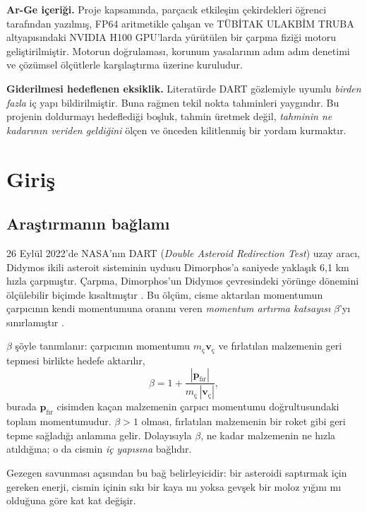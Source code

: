 \documentclass[12pt,a4paper]{article}
\begin{document}
\noindent\textbf{Ar-Ge içeriği.} Proje kapsamında, parçacık etkileşim
çekirdekleri öğrenci tarafından yazılmış, FP64 aritmetikle çalışan ve
TÜBİTAK ULAKBİM TRUBA altyapısındaki NVIDIA H100 GPU'larda yürütülen bir
çarpma fiziği motoru geliştirilmiştir. Motorun doğrulaması, korunum
yasalarının adım adım denetimi ve çözümsel ölçütlerle karşılaştırma
üzerine kuruludur.

\noindent\textbf{Giderilmesi hedeflenen eksiklik.} Literatürde DART
gözlemiyle uyumlu \emph{birden fazla} iç yapı bildirilmiştir. Buna
rağmen tekil nokta tahminleri yaygındır. Bu projenin doldurmayı
hedeflediği boşluk, tahmin üretmek değil, \emph{tahminin ne kadarının
veriden geldiğini} ölçen ve önceden kilitlenmiş bir yordam kurmaktır.

\section{Giriş}

\subsection{Araştırmanın bağlamı}

26 Eylül 2022'de NASA'nın DART (\emph{Double Asteroid Redirection Test})
uzay aracı, Didymos ikili asteroit sisteminin uydusu Dimorphos'a saniyede
yaklaşık 6,1 km hızla çarpmıştır. Çarpma, Dimorphos'un Didymos
çevresindeki yörünge dönemini ölçülebilir biçimde kısaltmıştır
\citep{daly2023}. Bu ölçüm, cisme aktarılan momentumun çarpıcının kendi
momentumuna oranını veren \emph{momentum artırma katsayısı} $\beta$'yı
sınırlamıştır \citep{cheng2023}.

$\beta$ şöyle tanımlanır: çarpıcının momentumu $m_{\text{ç}}
\mathbf{v}_{\text{ç}}$ ve fırlatılan malzemenin geri tepmesi birlikte
hedefe aktarılır,
\begin{equation}
\beta = 1 + \frac{|\mathbf{p}_{\text{fır}}|}
                 {m_{\text{ç}}\,|\mathbf{v}_{\text{ç}}|},
\label{esit:beta}
\end{equation}
burada $\mathbf{p}_{\text{fır}}$ cisimden kaçan malzemenin çarpıcı
momentumu doğrultusundaki toplam momentumudur. $\beta>1$ olması,
fırlatılan malzemenin bir roket gibi geri tepme sağladığı anlamına gelir.
Dolayısıyla $\beta$, ne kadar malzemenin ne hızla atıldığına; o da cismin
\emph{iç yapısına} bağlıdır.

Gezegen savunması açısından bu bağ belirleyicidir: bir asteroidi
saptırmak için gereken enerji, cismin içinin sıkı bir kaya mı yoksa gevşek
bir moloz yığını mı olduğuna göre kat kat değişir.
\end{document}
